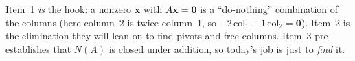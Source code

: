 \documentclass[10pt]{article}
\newcommand{\xx}{\mathbf{x}}
\newcommand{\zero}{\mathbf{0}}
\begin{document}
\begin{teachernote}
Item~1 \emph{is} the hook: a nonzero $\xx$ with $A\xx=\zero$ is a ``do-nothing'' combination of the
columns (here column~2 is twice column~1, so $-2\,$col$_1+1\,$col$_2=\zero$). Item~2 is the elimination
they will lean on to find pivots and free columns. Item~3 pre-establishes that $N(A)$ is closed under
addition, so today's job is just to \emph{find} it.
\end{teachernote}
\end{document}
